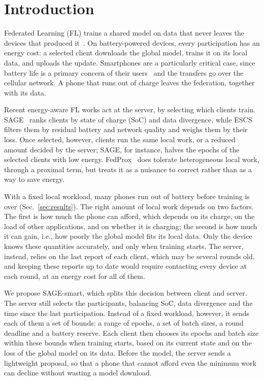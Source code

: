 \section{Introduction}\label{sec:intro}

Federated Learning (FL) trains a shared model on data that never leaves the
devices that produced it~\cite{mcmahan2017fedavg}. On battery-powered devices,
every participation has an energy cost: a selected client downloads the global
model, trains it on its local data, and uploads the update. Smartphones are a
particularly critical case, since battery life is a primary concern of their
users~\cite{ferreira2011battery} and the transfers go over the cellular
network. A phone that runs out of charge leaves the federation, together with
its data.

Recent energy-aware FL works act at the server, by selecting which clients
train. SAGE~\cite{savoia2026sage} ranks clients by state of charge (SoC) and
data divergence, while ESCS~\cite{maciel2024escs} filters them by residual
battery and network quality and weighs them by their loss. Once selected,
however, clients run the same local work, or a reduced amount decided by the
server; SAGE, for instance, halves the epochs of the selected clients with low
energy. FedProx~\cite{li2020fedprox} does tolerate heterogeneous local work,
through a proximal term, but treats it as a nuisance to correct rather than as
a way to save energy.

With a fixed local workload, many phones run out of battery before training is
over (Sec.~\ref{sec:results}). The right amount of local work depends on two
factors. The first is how much the phone can afford, which depends on its
charge, on the load of other applications, and on whether it is charging; the
second is how much it can gain, i.e., how poorly the global model fits its
local data. Only the device knows these quantities accurately, and only when
training starts. The server, instead, relies on the last report of each client,
which may be several rounds old, and keeping these reports up to date would
require contacting every device at each round, at an energy cost for all of
them.

We propose SAGE-smart, which splits this decision between client and server.
The server still selects the participants, balancing SoC, data divergence and
the time since the last participation. Instead of a fixed workload, however, it
sends each of them a set of bounds: a range of epochs, a set of batch sizes, a
round deadline and a battery reserve. Each client then chooses its epochs and
batch size within these bounds when training starts, based on its current
state and on the loss of the global model on its data. Before the model, the
server sends a lightweight proposal, so that a phone that cannot afford even
the minimum work can decline without wasting a model download.


